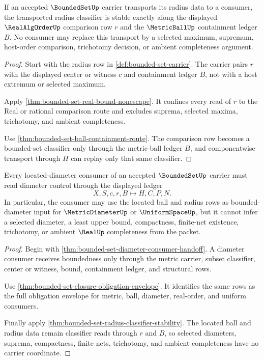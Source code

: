 \begin{theorem}
\label{thm:bounded-set-radius-classifier-stability}
If an accepted $\BoundedSetUp$ carrier transports its radius data to a consumer, the transported radius classifier is stable exactly along the displayed $\RealAlgOrderUp$ comparison row $r$ and the $\MetricBallUp$ containment ledger $B$. No consumer may replace this transport by a selected maximum, supremum, host-order comparison, trichotomy decision, or ambient completeness argument.
\end{theorem}
\begin{proof}
Start with the radius row in \autoref{def:bounded-set-carrier}. The carrier pairs $r$ with the displayed center or witness $c$ and containment ledger $B$, not with a host extremum or selected maximum.

Apply \autoref{thm:bounded-set-real-bound-nonescape}. It confines every read of $r$ to the Real or rational comparison route and excludes suprema, selected maxima, trichotomy, and ambient completeness.

Use \autoref{thm:bounded-set-ball-containment-route}. The comparison row becomes a bounded-set classifier only through the metric-ball ledger $B$, and componentwise transport through $H$ can replay only that same classifier.
\end{proof}

\begin{theorem}
\label{thm:bounded-set-located-diameter-readback}
Every located-diameter consumer of an accepted $\BoundedSetUp$ carrier must read diameter control through the displayed ledger
$$
X,S,c,r,B \longmapsto H,C,P,N .
$$
In particular, the consumer may use the located ball and radius rows as bounded-diameter input for $\MetricDiameterUp$ or $\UniformSpaceUp$, but it cannot infer a selected diameter, a least upper bound, compactness, finite-net existence, trichotomy, or ambient $\RealUp$ completeness from the packet.
\end{theorem}
\begin{proof}
Begin with \autoref{thm:bounded-set-diameter-consumer-handoff}. A diameter consumer receives boundedness only through the metric carrier, subset classifier, center or witness, bound, containment ledger, and structural rows.

Use \autoref{thm:bounded-set-closure-obligation-envelope}. It identifies the same rows as the full obligation envelope for metric, ball, diameter, real-order, and uniform consumers.

Finally apply \autoref{thm:bounded-set-radius-classifier-stability}. The located ball and radius data remain classifier reads through $r$ and $B$, so selected diameters, suprema, compactness, finite nets, trichotomy, and ambient completeness have no carrier coordinate.
\end{proof}

